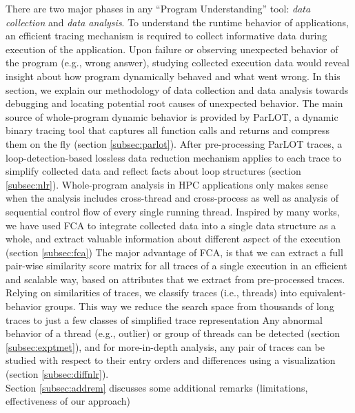 There are two major phases in any ``Program Understanding'' tool: \textit{data collection} and \textit{data analysis}.
%
To understand the runtime behavior of applications, an efficient tracing mechanism is required to collect informative data during execution of the application.
%
Upon failure or observing unexpected behavior of the program (e.g., wrong answer), studying collected execution data would reveal insight about how program dynamically behaved and what went wrong.
%
In this section, we explain our methodology of data collection and data analysis towards debugging and locating potential root causes of unexpected behavior.
%
The main source of whole-program dynamic behavior is provided by ParLOT, a dynamic binary tracing tool that captures all function calls and returns and compress them on the fly (section \ref{subsec:parlot}).
%
After pre-processing ParLOT traces, a loop-detection-based lossless data reduction mechanism applies to each trace to
simplify collected data and reflect facts about loop structures (section \ref{subsec:nlr}).
%
Whole-program analysis in HPC applications only makes sense when the analysis includes cross-thread and cross-process as well as analysis of sequential control flow of every single running thread.
%
Inspired by many works\cite{weberStructural}\citep{Alqadah2011}\cite{Ignatov17}\cite{latticeForDistConst}, we have used FCA\cite{clbook} to integrate collected data into a single data structure as a whole, and extract valuable information about different aspect of the execution (section \ref{subsec:fca})
%
The major advantage of FCA, is that we can extract a full pair-wise similarity score matrix for all traces of a single execution in an efficient and scalable way, based on attributes that we extract from pre-processed traces.
%
Relying on similarities of traces, we classify traces (i.e., threads) into equivalent-behavior groups.
%
This way we reduce the search space from thousands of long traces to just a few classes of simplified trace representation
%
Any abnormal behavior of a thread (e.g., outlier) or group of threads can be detected (section \ref{subsec:exptmet}),
%
and for more-in-depth analysis, any pair of traces can be studied with respect to their entry orders and differences using a visualization (section \ref{subsec:diffnlr}).
%
\\
Section \ref{subsec:addrem} discusses some additional remarks (limitations, effectiveness of our approach)
\\
%


